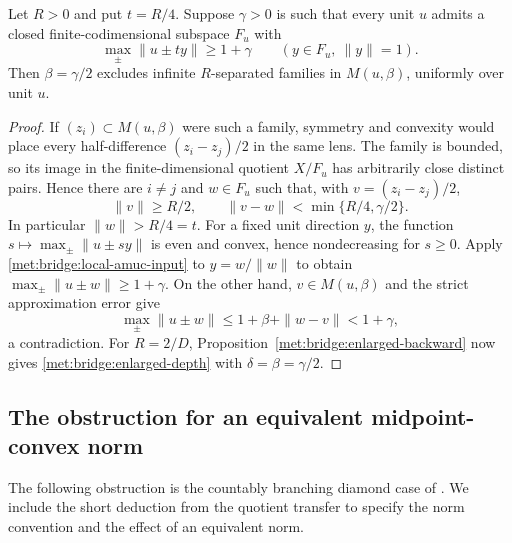 \begin{lemma}
\label{met:bridge:local-amuc}
Let $R>0$ and put $t=R/4$. Suppose $\gamma>0$ is such that every
unit $u$ admits a closed finite-codimensional subspace $F_u$ with
\begin{equation}\label{met:bridge:local-amuc-input}
 \max_\pm\|u\pm t y\|\ge1+\gamma
 \qquad(y\in F_u,\ \|y\|=1).
\end{equation}
Then $\beta=\gamma/2$ excludes infinite $R$-separated families in
$M(u,\beta)$, uniformly over unit $u$.
\end{lemma}
\begin{proof}
If $(z_i)\subset M(u,\beta)$ were such a family, symmetry and
convexity would place every half-difference $(z_i-z_j)/2$ in the
same lens. The family is bounded, so its image in the
finite-dimensional quotient $X/F_u$ has arbitrarily close distinct
pairs. Hence there are $i\ne j$ and $w\in F_u$ such that, with
$v=(z_i-z_j)/2$,
\[
 \|v\|\ge R/2,\qquad
 \|v-w\|<\min\{R/4,\gamma/2\}.
\]
In particular $\|w\|>R/4=t$. For a fixed unit direction $y$, the
function $s\mapsto\max_\pm\|u\pm s y\|$ is even and convex,
hence nondecreasing for $s\ge0$. Apply
\eqref{met:bridge:local-amuc-input} to $y=w/\|w\|$ to obtain
$\max_\pm\|u\pm w\|\ge1+\gamma$. On the other hand,
$v\in M(u,\beta)$ and the strict approximation error give
\[
 \max_\pm\|u\pm w\|
 \le1+\beta+\|w-v\|<1+\gamma,
\]
a contradiction. For $R=2/D$, Proposition~\ref{met:bridge:enlarged-backward}
now gives \eqref{met:bridge:enlarged-depth} with $\delta=\beta=\gamma/2$.
\end{proof}

\subsection{The obstruction for an equivalent midpoint-convex norm}
\label{met:bridge:renorming-section}
The following obstruction is the countably branching diamond case of
\cite[Theorem~4.1]{BaudierEtAl2017}. We include the short deduction
from the quotient transfer to specify the norm convention and the
effect of an equivalent norm.

